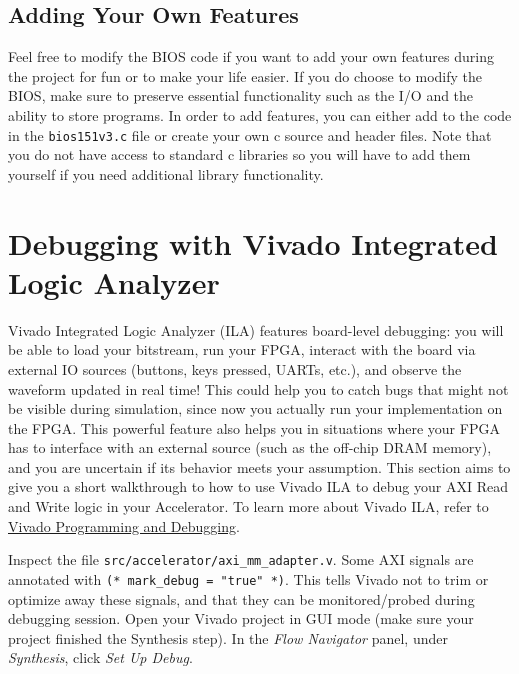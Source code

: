 \documentclass[11pt]{article}
\begin{document}
\begin{appendices}
\subsection{Adding Your Own Features}
Feel free to modify the BIOS code if you want to add your own features during the project for
fun or to make your life easier. If you do choose to modify the BIOS, make sure to preserve
essential functionality such as the I/O and the ability to store programs. In order to add
features, you can either add to the code in the \verb|bios151v3.c| file or create your own c source and
header files. Note that you do not have access to standard c libraries so you will have to add
them yourself if you need additional library functionality.

\pagebreak
\section{Debugging with Vivado Integrated Logic Analyzer}
\label{sec:vivado_ila}

Vivado Integrated Logic Analyzer (ILA) features board-level debugging: you will be able to load your bitstream, run your FPGA, interact with the board via external IO sources (buttons, keys pressed, UARTs, etc.), and observe the waveform updated in real time! This could help you to catch bugs that might not be visible during simulation, since now you actually run your implementation on the FPGA. This powerful feature also helps you in situations where your FPGA has to interface with an external source (such as the off-chip DRAM memory), and you are uncertain if its behavior meets your assumption. This section aims to give you a short walkthrough to how to use Vivado ILA to debug your AXI Read and Write logic in your Accelerator. To learn more about Vivado ILA, refer to \href{https://www.xilinx.com/support/documentation/sw_manuals/xilinx2019_2/ug908-vivado-programming-debugging.pdf}{Vivado Programming and Debugging}.

Inspect the file \verb|src/accelerator/axi_mm_adapter.v|. Some AXI signals are annotated with \verb|(* mark_debug = "true" *)|. This tells Vivado not to trim or optimize away these signals, and that they can be monitored/probed during debugging session. Open your Vivado project in GUI mode (make sure your project finished the Synthesis step). In the \emph{Flow Navigator} panel, under \emph{Synthesis}, click \emph{Set Up Debug}.


\end{appendices}
\end{document}
